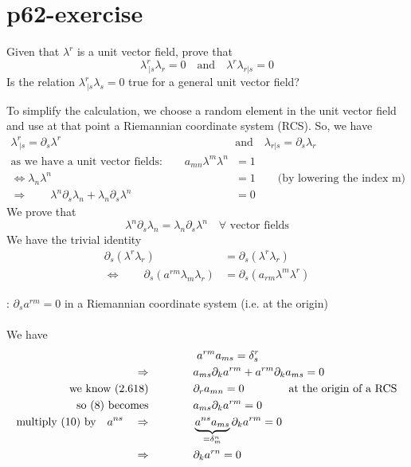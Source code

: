 \section{p62-exercise}
\begin{tcolorbox}
Given that $\lambda^r$ is a unit vector field, prove that $$\lambda^r_{\ |s}\lambda_r = 0 \quad \text{and}\quad \lambda^r\lambda_{r|s} = 0 $$
Is the relation $\lambda^r_{\ |s}\lambda_s = 0$ true for a general unit vector field?
\end{tcolorbox}
To simplify the calculation, we choose a random element in the unit vector field and use at that point a Riemannian coordinate system (RCS). So, we have
\begin{align}
\lambda^r_{\ |s} = \partial_s \lambda^r \quad & \text{and}\quad \lambda_{r|s} = \partial_s \lambda_r\\
\text{as we have a unit vector fields:}\quad\quad a_{mn}\lambda^m\lambda^n &= 1\\
\Leftrightarrow \lambda_n\lambda^n &= 1\quad\quad\text{(by lowering the index m)}\\
\Rightarrow \quad\quad \lambda^n\partial_s \lambda_n + \lambda_n\partial_s \lambda^n &= 0
\end{align}
We prove that $$\lambda^n\partial_s\lambda_n = \lambda_n\partial_s\lambda^n\quad \forall\text{ vector fields}$$
We have the trivial identity
\begin{align}
\partial_s(\lambda^r\lambda_r) &= \partial_s(\lambda^r\lambda_r)\\
\Leftrightarrow \quad\quad \partial_s(a^{rm}\lambda_m\lambda_r) &= \partial_s(a_{rm}\lambda^m\lambda^r)
\end{align}
\begin{lemma}: $\partial_sa^{rm} = 0$ in a Riemannian coordinate system (i.e. at the origin)\\\\
We have
\begin{align}
&\ a^{rm}a_{ms} = \delta^r_s\\
\Rightarrow \quad\quad\quad\quad &a_{ms}\partial_k a^{rm}   +a^{rm}\partial_k a_{ms} = 0\\
\text{we know (2.618)}\quad\quad\quad\quad &\partial_r a_{mn} = 0\quad\quad\quad\quad \text{at the origin of a RCS}\\
\text{so (8) becomes}\quad\quad\quad\quad  &a_{ms}\partial_k a^{rm}  = 0\\
\text{multiply (10) by}\quad  a^{ns}\quad\Rightarrow \quad\quad\quad\quad  &\underbrace{a^{ns}a_{ms}}_{= \delta^n_m}\partial_k a^{rm} = 0\\
\Rightarrow\quad\quad\quad\quad  &\partial_k a^{rn} = 0
\end{align}
\end{lemma}
